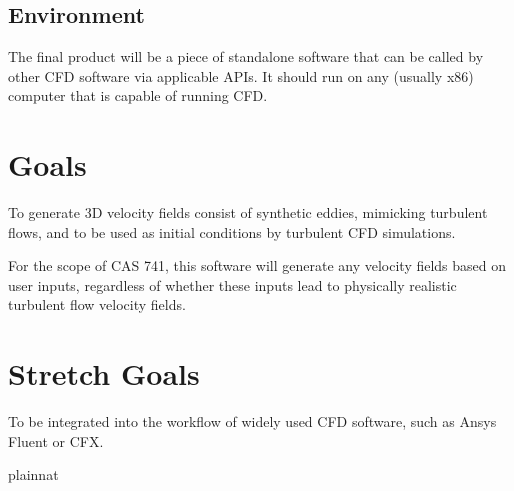 \documentclass{article}
\begin{document}
\subsection{Environment}
The final product will be a piece of standalone software that can be called by other CFD software via applicable APIs. It should run on any (usually x86) computer that is capable of running CFD.

\newpage
\section{Goals}
To generate 3D velocity fields consist of synthetic eddies, mimicking turbulent flows, and to be used as initial conditions by turbulent CFD simulations.

For the scope of CAS 741, this software will generate any velocity fields based on user inputs, regardless of whether these inputs lead to physically realistic turbulent flow velocity fields. 

\section{Stretch Goals}
To be integrated into the workflow of widely used CFD software, such as Ansys Fluent or CFX. 

 {plainnat}

\end{document}
